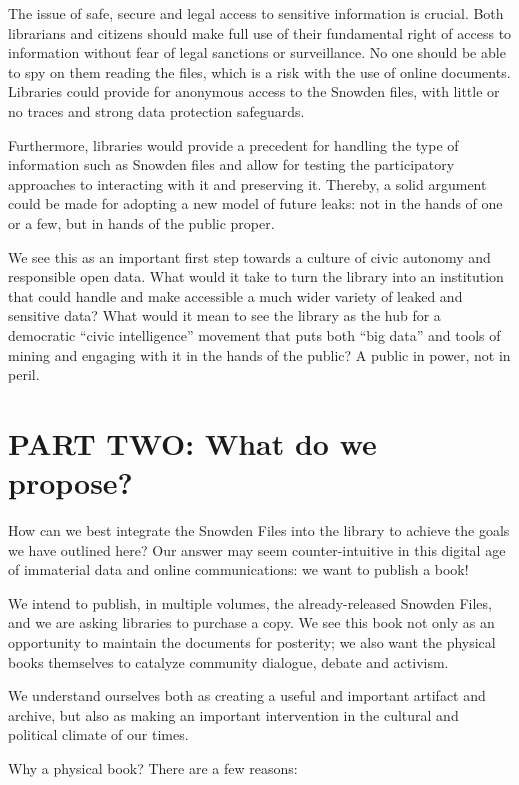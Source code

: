 \documentclass[a4paper,
fontsize=11pt,
oneside,
numbers=noperiodatend,
parskip=half-,
bibliography=totoc,
final
]{scrartcl}
\begin{document}
The issue of safe, secure and legal access to sensitive information is
crucial. Both librarians and citizens should make full use of their
fundamental right of access to information without fear of legal
sanctions or surveillance. No one should be able to spy on them reading
the files, which is a risk with the use of online documents. Libraries
could provide for anonymous access to the Snowden files, with little or
no traces and strong data protection safeguards.

Furthermore, libraries would provide a precedent for handling the type
of information such as Snowden files and allow for testing the
participatory approaches to interacting with it and preserving it.
Thereby, a solid argument could be made for adopting a new model of
future leaks: not in the hands of one or a few, but in hands of the
public proper.

We see this as an important first step towards a culture of civic
autonomy and responsible open data. What would it take to turn the
library into an institution that could handle and make accessible a much
wider variety of leaked and sensitive data? What would it mean to see
the library as the hub for a democratic \enquote{civic intelligence}
movement that puts both \enquote{big data} and tools of mining and
engaging with it in the hands of the public? A public in power, not in
peril.

\section*{PART TWO: What do we propose?}\label{part-two-what-do-we-want-to-do}

How can we best integrate the Snowden Files into the library to achieve
the goals we have outlined here? Our answer may seem counter-intuitive
in this digital age of immaterial data and online communications: we
want to publish a book!

We intend to publish, in multiple volumes, the already-released Snowden
Files, and we are asking libraries to purchase a copy. We see this book
not only as an opportunity to maintain the documents for posterity; we
also want the physical books themselves to catalyze community dialogue,
debate and activism.

We understand ourselves both as creating a useful and important artifact
and archive, but also as making an important intervention in the
cultural and political climate of our times.

Why a physical book? There are a few reasons:
\end{document}
